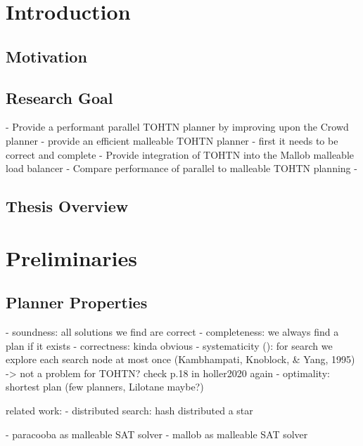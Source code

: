 \documentclass[enabledeprecatedfontcommands,12pt,a4paper,twoside]{scrartcl}
\numberwithin{equation}{section}
\begin{document}
\listoffigures
\listoftables
\listofalgorithms

\clearpage


\section{Introduction}
\subsection{Motivation}

\subsection{Research Goal}
- Provide a performant parallel TOHTN planner by improving upon the Crowd planner
- provide an efficient malleable TOHTN planner
	- first it needs to be correct and complete
- Provide integration of TOHTN into the Mallob malleable load balancer
- Compare performance of parallel to malleable TOHTN planning
- 
\subsection{Thesis Overview}


\section{Preliminaries}

\subsection{Planner Properties}
- soundness: all solutions we find are correct
- completeness: we always find a plan if it exists
- correctness: kinda obvious
- systematicity (\cite{holler2020htn}): for search we explore each search node at most once (Kambhampati, Knoblock, \& Yang, 1995) -> not a problem for TOHTN? check p.18 in holler2020 again
- optimality: shortest plan (few planners, Lilotane maybe?)







related work:
- distributed search: hash distributed a star

- paracooba as malleable SAT solver
- mallob as malleable SAT solver
\end{document}
